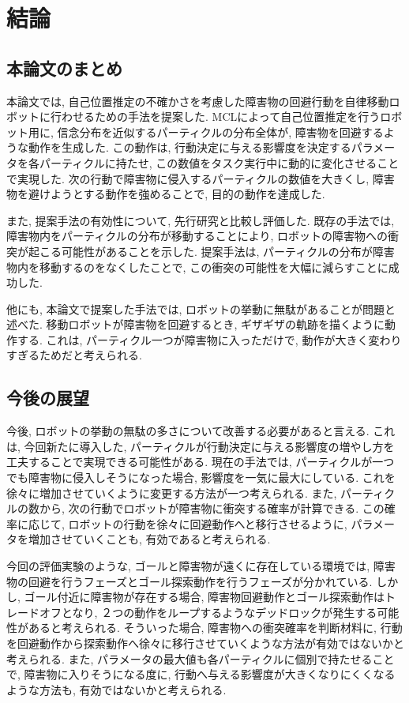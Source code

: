 \chapter{結論} \label{chapter:conclusion}

\section{本論文のまとめ}
本論文では, 自己位置推定の不確かさを考慮した障害物の回避行動を自律移動ロボットに行わせるための手法を提案した. 
MCLによって自己位置推定を行うロボット用に, 信念分布を近似するパーティクルの分布全体が, 障害物を回避するような動作を生成した. 
この動作は, 行動決定に与える影響度を決定するパラメータを各パーティクルに持たせ, この数値をタスク実行中に動的に変化させることで実現した. 
次の行動で障害物に侵入するパーティクルの数値を大きくし, 障害物を避けようとする動作を強めることで, 目的の動作を達成した. 

また, 提案手法の有効性について, 先行研究と比較し評価した. 
既存の手法では, 障害物内をパーティクルの分布が移動することにより, ロボットの障害物への衝突が起こる可能性があることを示した. 
提案手法は, パーティクルの分布が障害物内を移動するのをなくしたことで, この衝突の可能性を大幅に減らすことに成功した. 

他にも, 本論文で提案した手法では, ロボットの挙動に無駄があることが問題と述べた. 
移動ロボットが障害物を回避するとき, ギザギザの軌跡を描くように動作する. 
これは, パーティクル一つが障害物に入っただけで, 動作が大きく変わりすぎるためだと考えられる. 


\section{今後の展望}
今後, ロボットの挙動の無駄の多さについて改善する必要があると言える. 
これは, 今回新たに導入した, パーティクルが行動決定に与える影響度の増やし方を工夫することで実現できる可能性がある. 
現在の手法では, パーティクルが一つでも障害物に侵入しそうになった場合, 影響度を一気に最大にしている. 
これを徐々に増加させていくように変更する方法が一つ考えられる. 
また, パーティクルの数から, 次の行動でロボットが障害物に衝突する確率が計算できる. 
この確率に応じて, ロボットの行動を徐々に回避動作へと移行させるように, パラメータを増加させていくことも, 有効であると考えられる. 

今回の評価実験のような, ゴールと障害物が遠くに存在している環境では, 
障害物の回避を行うフェーズとゴール探索動作を行うフェーズが分かれている. 
しかし, ゴール付近に障害物が存在する場合, 障害物回避動作とゴール探索動作はトレードオフとなり, 
２つの動作をループするようなデッドロックが発生する可能性があると考えられる. 
そういった場合, 障害物への衝突確率を判断材料に, 行動を回避動作から探索動作へ徐々に移行させていくような方法が有効ではないかと考えられる. 
また, パラメータの最大値も各パーティクルに個別で持たせることで, 
障害物に入りそうになる度に, 行動へ与える影響度が大きくなりにくくなるような方法も, 有効ではないかと考えられる. 
